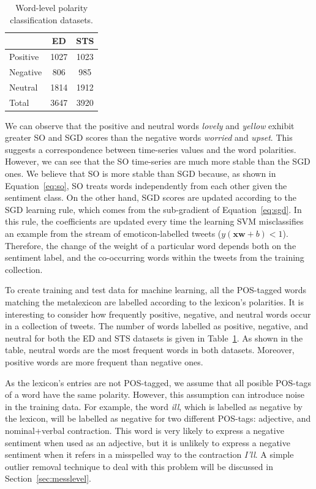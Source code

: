 \documentclass{sig-alternate}
\begin{document}
\begin{table}[htb]
\begin{center}
\begin{tabular}{l|c|c}
\hline
 & ED & STS \\ \hline
Positive & 1027 & 1023 \\ 
Negative & 806 & 985 \\ 
Neutral & 1814 & 1912 \\ 
Total & 3647 & 3920 \\ \hline
\end{tabular}
\end{center}
\caption{Word-level polarity classification datasets.}
\label{tab:wordcorpus}
\end{table}


We can observe that the positive and neutral words \emph{lovely} and \emph{yellow} exhibit greater SO and SGD scores than the negative words  \emph{worried} and \emph{upset}. This  suggests a correspondence between time-series values and the word polarities. However, we can see that the SO time-series are much more stable than the SGD ones. We believe that SO is more stable than SGD because, as shown in Equation~\ref{eq:so}, SO treats words  independently from each other given the sentiment class. On the other hand, SGD scores are updated according to the SGD learning rule, which comes from the sub-gradient of Equation~\ref{eq:sgd}. In this rule, the coefficients are updated every time the learning SVM misclassifies an example from the stream of emoticon-labelled tweets ($y(\mathbf{xw} +b) <1$). Therefore, the change of the weight of a particular word depends both on the sentiment label, and the co-occurring words within the tweets from the training collection.  


To create training and test data for machine learning, all the POS-tagged words matching the metalexicon are labelled according to the lexicon's polarities. It is interesting to consider how frequently positive, negative, and neutral words occur in a collection of tweets. The number of words labelled as positive, negative, and neutral for both the ED and STS datasets is given in Table~\ref{tab:wordcorpus}. As shown in the table, neutral words are the most frequent words in both datasets. Moreover, positive words are more frequent than negative ones. 



As the lexicon's entries are not POS-tagged, we assume that all posible POS-tags of a word have the same polarity. However, this assumption can introduce noise in the training data. For example, the word \emph{ill}, which is labelled as negative by the lexicon, will be labelled as negative for two different POS-tags: adjective, and nominal+verbal contraction. This word is very likely to express a negative sentiment when used as an adjective, but it is unlikely to express a negative sentiment when it refers in a misspelled way to the contraction \emph{I'll}. A simple outlier removal technique to deal with this problem will be discussed in Section~\ref{sec:messlevel}.
 
\end{document}

